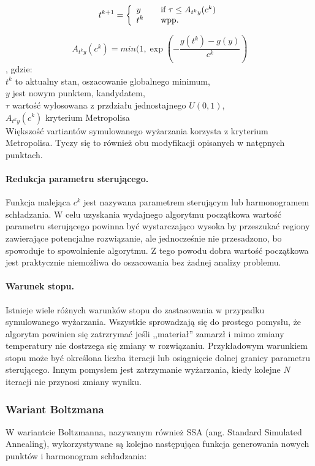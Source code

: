 \documentclass{article}
\begin{document}
\[
  t^{k+1} = \left\{
  \begin{array}{l l}
    y & \quad \textrm{if $\tau \leq A_{{t^k}y}(c^k) $}\\
    t^k & \quad \textrm{wpp.}\\
  \end{array} \right.
\]

\[
A_{{t^k}y}(c^k) = min(1, \exp(-\frac{g(t^k)-g(y)}{c^k}) 
\]
, gdzie: \\ 
        $ t^k $ to aktualny stan, oszacowanie globalnego minimum, \\ 
        $ y $ jest nowym punktem, kandydatem, \\ 
        $\tau$ wartość wylosowana z przdziału jednostajnego $U(0,1)$, \\
        $ A_{{t^k}y}(c^k) $ kryterium Metropolisa \\

Większość vartiantów symulowanego wyżarzania korzysta z kryterium Metropolisa. Tyczy się to również obu modyfikacji opisanych w natępnych punktach.

    \paragraph{Redukcja parametru sterującego.}
    Funkcja malejąca $ c^k $ jest nazywana parametrem sterującym lub harmonogramem schładzania. W celu uzyskania wydajnego algorytmu początkowa wartość parametru sterującego powinna być wystarczająco wysoka by przeszukać regiony zawierające potencjalne rozwiązanie, ale jednocześnie nie przesadzono, bo spowoduje to spowolnienie algorytmu. Z tego powodu dobra wartość początkowa jest praktycznie niemożliwa do oszacowania bez żadnej analizy problemu. 

    \paragraph{Warunek stopu.}
    Istnieje wiele różnych warunków stopu do zastasowania w przypadku symulowanego wyżarzania. Wszystkie sprowadzają się do prostego pomysłu, że algorytm powinien się zatrzrymać jeśli ,,materiał'' zamarzł i mimo zmiany temperatury nie dostrzega się zmiany w rozwiązaniu. Przykładowym warunkiem stopu może być określona liczba iteracji lub osiągnięcie dolnej granicy parametru sterującego. Innym pomysłem jest zatrzymanie wyżarzania, kiedy kolejne $ N $ iteracji nie przynosi zmiany wyniku.

\subsubsection{Wariant Boltzmana}
W wariantcie Boltzmanna, nazywanym również SSA (ang. Standard Simulated Annealing), wykorzystywane są kolejno następująca funkcja generowania nowych punktów i harmonogram schładzania:
\end{document}
